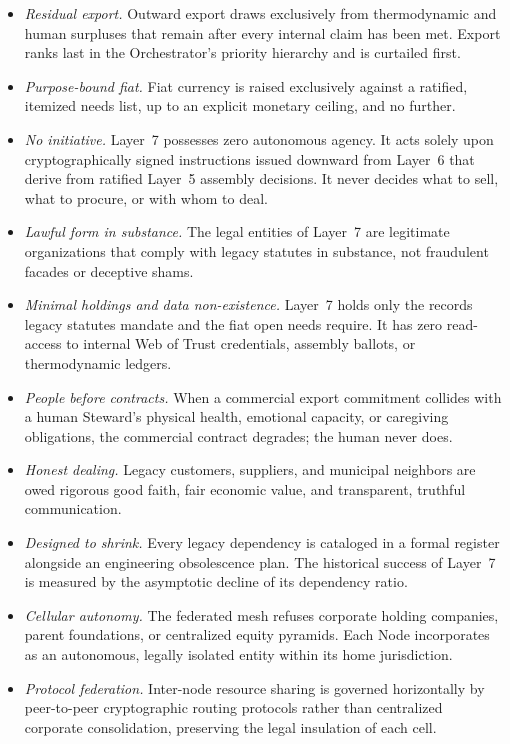 \begin{itemize}
  \item \textit{Residual export.} Outward export draws exclusively from thermodynamic and human surpluses that remain after every internal claim has been met. Export ranks last in the Orchestrator's priority hierarchy and is curtailed first.
  \item \textit{Purpose-bound fiat.} Fiat currency is raised exclusively against a ratified, itemized needs list, up to an explicit monetary ceiling, and no further.
  \item \textit{No initiative.} Layer~7 possesses zero autonomous agency. It acts solely upon cryptographically signed instructions issued downward from Layer~6 that derive from ratified Layer~5 assembly decisions. It never decides what to sell, what to procure, or with whom to deal.
  \item \textit{Lawful form in substance.} The legal entities of Layer~7 are legitimate organizations that comply with legacy statutes in substance, not fraudulent facades or deceptive shams.
  \item \textit{Minimal holdings and data non-existence.} Layer~7 holds only the records legacy statutes mandate and the fiat open needs require. It has zero read-access to internal Web of Trust credentials, assembly ballots, or thermodynamic ledgers.
  \item \textit{People before contracts.} When a commercial export commitment collides with a human Steward's physical health, emotional capacity, or caregiving obligations, the commercial contract degrades; the human never does.
  \item \textit{Honest dealing.} Legacy customers, suppliers, and municipal neighbors are owed rigorous good faith, fair economic value, and transparent, truthful communication.
  \item \textit{Designed to shrink.} Every legacy dependency is cataloged in a formal register alongside an engineering obsolescence plan. The historical success of Layer~7 is measured by the asymptotic decline of its dependency ratio.
  \item \textit{Cellular autonomy.} The federated mesh refuses corporate holding companies, parent foundations, or centralized equity pyramids. Each Node incorporates as an autonomous, legally isolated entity within its home jurisdiction.
  \item \textit{Protocol federation.} Inter-node resource sharing is governed horizontally by peer-to-peer cryptographic routing protocols rather than centralized corporate consolidation, preserving the legal insulation of each cell.
\end{itemize}


